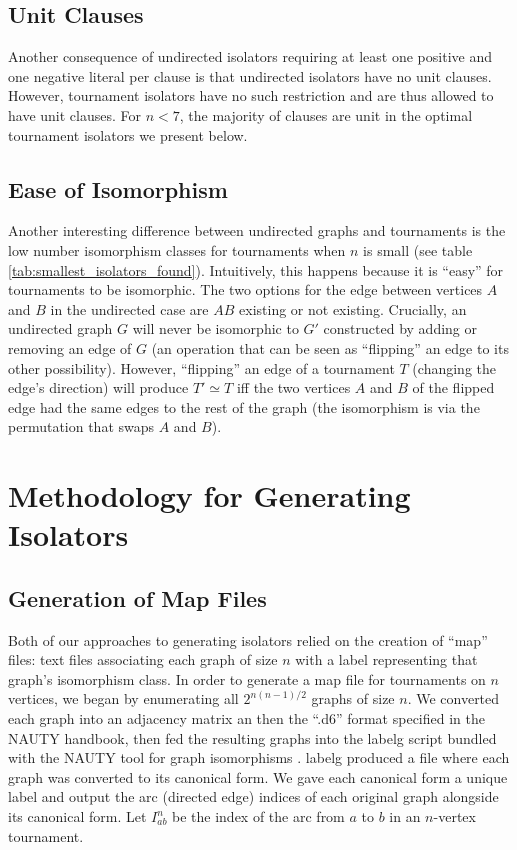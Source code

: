\documentclass[a4paper,UKenglish,cleveref, autoref, thm-restate]{lipics-v2021}
\begin{document}
\subsection{Unit Clauses}
Another consequence of undirected isolators requiring at least one positive and one negative literal per clause is that undirected isolators have no unit clauses. However, tournament isolators have no such restriction and are thus allowed to have unit clauses. For $n<7$, the majority of clauses are unit in the optimal tournament isolators we present below.

\subsection{Ease of Isomorphism}
Another interesting difference between undirected graphs and tournaments is the low number isomorphism classes for tournaments when $n$ is small (see table \ref{tab:smallest_isolators_found}). Intuitively, this happens because it is ``easy'' for tournaments to be isomorphic. The two options for the edge between vertices $A$ and $B$ in the undirected case are $AB$ existing or not existing. Crucially, an undirected graph $G$ will never be isomorphic to $G'$ constructed by adding or removing an edge of $G$ (an operation that can be seen as ``flipping'' an edge to its other possibility). However, ``flipping'' an edge of a tournament $T$ (changing the edge's direction) will produce $T' \simeq T$ iff the two vertices $A$ and $B$ of the flipped edge had the same edges to the rest of the graph (the isomorphism is via the permutation that swaps $A$ and $B$).

\section{Methodology for Generating Isolators}

\subsection{Generation of Map Files}
Both of our approaches to generating isolators relied on the creation of ``map'' files: text files associating each graph of size $n$ with a label representing that graph's isomorphism class. In order to generate a map file for tournaments on $n$ vertices, we began by enumerating all $2^{n(n-1)/2}$ graphs of size $n$. We converted each graph into an adjacency matrix an then the ``.d6'' format specified in the NAUTY handbook, then fed the resulting graphs into the labelg script bundled with the NAUTY tool for graph isomorphisms \cite{ref_nauty}. labelg produced a file where each graph was converted to its canonical form. We gave each canonical form a unique label and output the arc (directed edge) indices of each original graph alongside its canonical form. Let $I_{ab}^n$ be the index of the arc from $a$ to $b$ in an $n$-vertex tournament.
\end{document}
